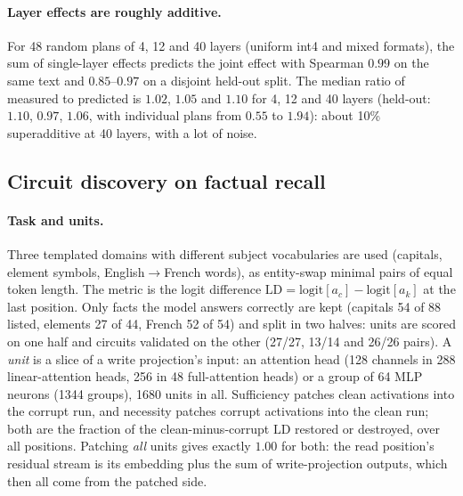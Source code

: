 \documentclass[11pt]{article}
\begin{document}
\paragraph{Layer effects are roughly additive.}
For 48 random plans of 4, 12 and 40 layers (uniform int4 and mixed formats), the sum of single-layer effects predicts the joint effect with Spearman
$0.99$ on the same text and $0.85$--$0.97$ on a disjoint held-out split. The median ratio of measured to predicted is $1.02$, $1.05$ and $1.10$
for 4, 12 and 40 layers (held-out: $1.10$, $0.97$, $1.06$, with individual plans from $0.55$ to $1.94$): about 10\% superadditive at 40 layers, with a lot of noise.

\subsection{Circuit discovery on factual recall}
\paragraph{Task and units.}
Three templated domains with different subject vocabularies are used (capitals, element symbols, English$\to$French words), as entity-swap minimal pairs of equal token
length. The metric is the logit difference $\mathrm{LD}=\mathrm{logit}[a_c]-\mathrm{logit}[a_k]$ at the last position. Only facts the model answers correctly are kept
(capitals 54 of 88 listed, elements 27 of 44, French 52 of 54) and split in two halves: units are scored on one half and circuits validated on the other
(27/27, 13/14 and 26/26 pairs). A \emph{unit} is a slice of a write projection's input: an attention head (128 channels in 288 linear-attention heads, 256 in 48 full-attention heads)
or a group of 64 MLP neurons (1344 groups), 1680 units in all. Sufficiency patches clean activations into the corrupt run, and necessity patches corrupt activations into the clean
run; both are the fraction of the clean-minus-corrupt $\mathrm{LD}$ restored or destroyed, over all positions. Patching \emph{all} units gives exactly $1.00$ for both: the read position's
residual stream is its embedding plus the sum of write-projection outputs, which then all come from the patched side.
\end{document}
